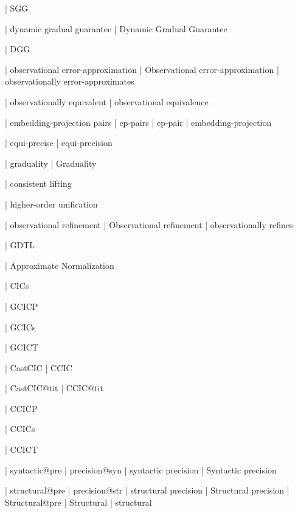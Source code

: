   | SGG

  | dynamic gradual guarantee
  | Dynamic Gradual Guarantee

  | DGG

  | observational error-approximation
  | Observational error-approximation
  | observationally error-approximates

  | observationally equivalent
  | observational equivalence

  | embedding-projection pairs
  | ep-pairs
  | ep-pair
  | embedding-projection

  | equi-precise
  | equi-precision

  | graduality
  | Graduality

  | consistent lifting

  | higher-order unification

  | observational refinement
  | Observational refinement
  | observationally refines

  | GDTL

  | Approximate Normalization

  | CICs

  | GCICP

  | GCICs

  | GCICT

  | CastCIC
  | CCIC

  | CastCIC@tit
  | CCIC@tit

  | CCICP

  | CCICs

  | CCICT

  | syntactic@pre
  | precision@syn
  | syntactic precision
  | Syntactic precision

  | structural@pre
  | precision@str
  | structural precision
  | Structural precision
  | Structural@pre
  | Structural
  | structural

